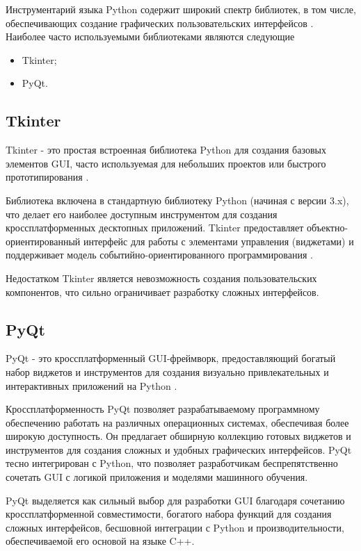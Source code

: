 Инструментарий языка Python содержит широкий спектр библиотек, в том числе,
обеспечивающих создание графических пользовательских интерфейсов
\cite{bib:tools:gui}. 
Наиболее часто используемыми библиотеками являются следующие

\begin{itemize}
  \item Tkinter;
  \item PyQt.
\end{itemize}


\subsection{Tkinter}

Tkinter - это простая встроенная библиотека Python
для создания базовых элементов GUI, часто
используемая для небольших проектов или быстрого
прототипирования \cite{bib:gui:tkinter}. 

Библиотека включена в стандартную библиотеку Python
(начиная с версии 3.x), что делает его наиболее
доступным инструментом для создания
кроссплатформенных десктопных приложений. Tkinter
предоставляет объектно-ориентированный интерфейс для
работы с элементами управления (виджетами) и
поддерживает модель событийно-ориентированного
программирования \cite{bib:gui:model-based}.

Недостатком Tkinter является невозможность создания пользовательских
компонентов, что сильно ограничивает разработку сложных интерфейсов.

\subsection{PyQt}

PyQt - это кроссплатформенный GUI-фреймворк,
предоставляющий богатый набор виджетов и
инструментов для создания визуально привлекательных
и интерактивных приложений на Python \cite{bib:gui:pyqt}.

Кроссплатформенность PyQt позволяет разрабатываемому
программному обеспечению работать на различных
операционных системах, обеспечивая более широкую
доступность. Он предлагает обширную коллекцию
готовых виджетов и инструментов для создания сложных
и удобных графических интерфейсов. PyQt тесно
интегрирован с Python, что позволяет разработчикам
беспрепятственно сочетать GUI с логикой приложения и
моделями машинного обучения.

PyQt выделяется как сильный выбор для разработки GUI благодаря сочетанию
кроссплатформенной совместимости, богатого набора функций для создания сложных
интерфейсов, бесшовной интеграции с Python и производительности, обеспечиваемой
его основой на языке C++. 

